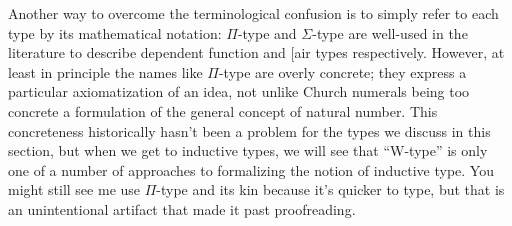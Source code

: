 \documentclass[11pt]{article} %
\theoremstyle{definition}
\theoremstyle{remark}
\begin{document}
Another way to overcome the terminological confusion is to simply refer to each type by its mathematical notation: $\Pi$-type and $\Sigma$-type are well-used in the literature to describe dependent function and [air types respectively.
However, at least in principle the names like $\Pi$-type are overly concrete; they express a particular axiomatization of an idea, not unlike Church numerals being too concrete a formulation of the general concept of natural number.
This concreteness historically hasn't been a problem for the types we discuss in this section, but when we get to inductive types, we will see that ``W-type'' is only one of a number of approaches to formalizing the notion of inductive type.
You might still see me use $\Pi$-type and its kin because it's quicker to type, but that is an unintentional artifact that made it past proofreading.
\end{document}
